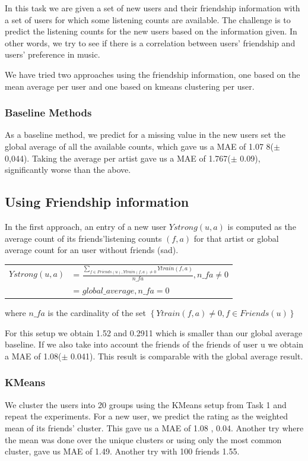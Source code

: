 In this task we are given a set of new users and their friendship information with a set of users
for which some listening counts are available. The challenge is to predict the listening counts for the new users based on the information given. In other words, we try to see if there is a correlation between
users' friendship and users' preference in music.

We have tried two approaches using the friendship information, one based on the mean average per user and one based on kmeans clustering per user.

\subsubsection{Baseline Methods}
As a baseline method, we predict for a missing value in the new users set the global average of all the available counts, which gave us a MAE of 1.07 8($\pm$0,044). Taking the average per artist gave us a MAE of 1.767($\pm$  0.09), significantly worse than the above.

\subsection{Using Friendship information}
In the first approach, an entry of a new user $Ystrong(u,a)$ is computed as the average count of its friends'listening counts $(f,a)$ for that artist or global average count for an user without friends (sad).

\begin{table}[h]
  \centering
  \begin{tabular}{ c  l }
  $Ystrong(u,a) $&= $\frac{\sum_{f\in Friends(u), Ytrain(f,a)\neq0}{Ytrain(f,a)}}{n\_fa}, n\_fa \neq 0$ \\ 
                          &= $global\_average, n\_fa = 0$ \\ 
  \end{tabular}
\end{table}
where $n\_fa$ is the cardinality of the set $\left\{ Ytrain(f,a)\neq0, f\in Friends(u)\right\}$

For this setup  we obtain  1.52 and 0.2911 which is smaller than our global average baseline.
If we also take into account the friends of the friends of user u we obtain  a MAE of 1.08($\pm$ 0.041). This result is comparable with the global average result.

\subsubsection{KMeans}
We cluster the users into 20 groups using the KMeans setup from Task 1
and repeat the experiments. For a new user, we predict the rating as the weighted mean of its friends' cluster. This gave us a MAE of
1.08 , 0.04.
Another try where the mean was done over the unique clusters or using only the most common cluster, gave us MAE of 1.49.
Another try with 100 friends 1.55.

